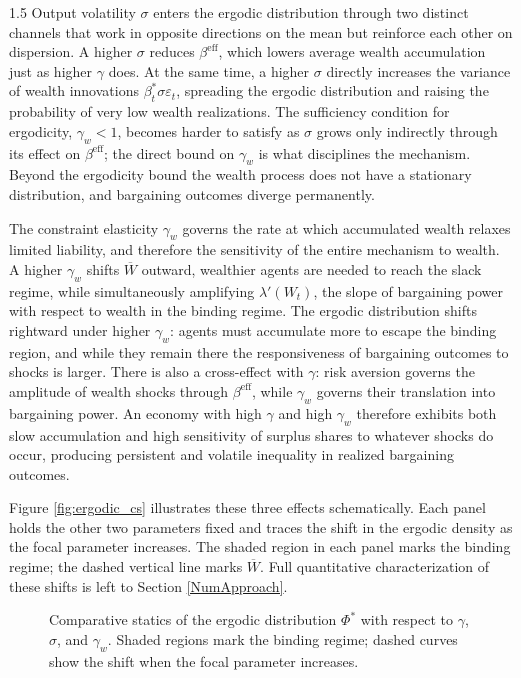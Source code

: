 \documentclass[12pt]{article}
\theoremstyle{definition}
\theoremstyle{plain}
\begin{document}
\begin{spacing}{1.5}
Output volatility $\sigma$ enters the ergodic distribution through two distinct channels that work in opposite directions on the mean but reinforce each other on dispersion. A higher $\sigma$ reduces $\beta^{\mathrm{eff}}$, which lowers average wealth accumulation just as higher $\gamma$ does. At the same time, a higher $\sigma$ directly increases the variance of wealth innovations $\beta_t^* \sigma \varepsilon_t$, spreading the ergodic distribution and raising the probability of very low wealth realizations. The sufficiency condition for ergodicity, $\gamma_w < 1$, becomes harder to satisfy as $\sigma$ grows only indirectly through its effect on $\beta^{\mathrm{eff}}$; the direct bound on $\gamma_w$ is what disciplines the mechanism. Beyond the ergodicity bound the wealth process does not have a stationary distribution, and bargaining outcomes diverge permanently.
 
The constraint elasticity $\gamma_w$ governs the rate at which accumulated wealth relaxes limited liability, and therefore the sensitivity of the entire mechanism to wealth. A higher $\gamma_w$ shifts $\overline{W}$ outward, wealthier agents are needed to reach the slack regime, while simultaneously amplifying $\lambda'(W_t)$, the slope of bargaining power with respect to wealth in the binding regime. The ergodic distribution shifts rightward under higher $\gamma_w$: agents must accumulate more to escape the binding region, and while they remain there the responsiveness of bargaining outcomes to shocks is larger. There is also a cross-effect with $\gamma$: risk aversion governs the amplitude of wealth shocks through $\beta^{\mathrm{eff}}$, while $\gamma_w$ governs their translation into bargaining power. An economy with high $\gamma$ and high $\gamma_w$ therefore exhibits both slow accumulation and high sensitivity of surplus shares to whatever shocks do occur, producing persistent and volatile inequality in realized bargaining outcomes.
 
Figure \ref{fig:ergodic_cs} illustrates these three effects schematically. Each panel holds the other two parameters fixed and traces the shift in the ergodic density as the focal parameter increases. The shaded region in each panel marks the binding regime; the dashed vertical line marks $\overline{W}$. Full quantitative characterization of these shifts is left to Section \ref{NumApproach}.
 
\begin{figure}[htbp]
\centering
\caption{Comparative statics of the ergodic distribution $\Phi^*$  with respect to $\gamma$, $\sigma$, and $\gamma_w$. Shaded regions mark the binding regime; dashed curves show the shift when the focal parameter increases.}
\begin{tikzpicture}[scale=1.0]
 

\end{tikzpicture}
\end{figure}
\end{spacing}
\end{document}
